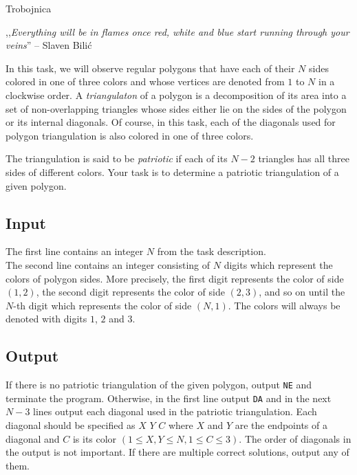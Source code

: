 \begin{statement}[
  problempoints=110,
  timelimit=2 seconds,
  memorylimit=512 MiB,
]{Trobojnica}



,,\textit{Everything will be in flames once red, white and blue start running through your veins}''
-- Slaven Bilić

In this task, we will observe regular polygons that have each of their $N$ sides
colored in one of three colors and whose vertices are denoted from $1$ to $N$
in a clockwise order. A \textit{triangulaton} of a polygon is a decomposition of
its area into a set of non-overlapping triangles whose sides either lie on the
sides of the polygon or its internal diagonals. Of course, in this task, each of
the diagonals used for polygon triangulation is also colored in one of three
colors.

The triangulation is said to be \textit{patriotic} if each of its $N-2$
triangles has all three sides of different colors. Your task is to determine
a patriotic triangulation of a given polygon.

\subsection*{Input}
The first line contains an integer $N$ from the task description. \\
The second line contains an integer consisting of $N$ digits which represent
the colors of polygon sides. More precisely, the first digit represents
the color of side $(1,2)$, the second digit represents the color of side $(2,3)$,
and so on until the $N$-th digit which represents the color of side $(N,1)$. The
colors will always be denoted with digits $1$, $2$ and $3$.

\subsection*{Output}
If there is no patriotic triangulation of the given polygon, output \texttt{NE}
and terminate the program. Otherwise, in the first line output \texttt{DA}
and in the next $N-3$ lines output each diagonal used in the patriotic
triangulation. Each diagonal should be specified as $X$ $Y$ $C$ where $X$ and
$Y$ are the endpoints of a diagonal and $C$ is its color
$(1 \le X, Y \le N, 1 \le C \le 3)$. The order of diagonals in the output is
not important. If there are multiple correct solutions, output any of them.


\end{statement}
